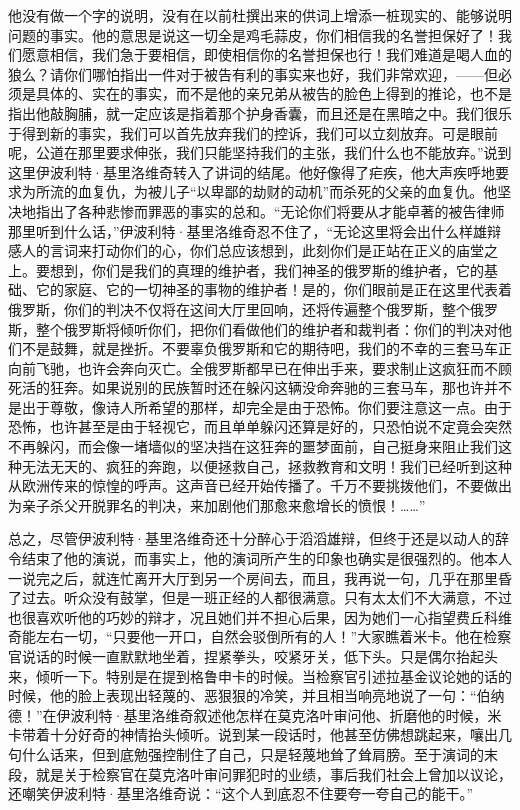 他没有做一个字的说明，没有在以前杜撰出来的供词上增添一桩现实的、能够说明问题的事实。他的意思是说这一切全是鸡毛蒜皮，你们相信我的名誉担保好了！我们愿意相信，我们急于要相信，即使相信你的名誉担保也行！我们难道是喝人血的狼么？请你们哪怕指出一件对于被告有利的事实来也好，我们非常欢迎，——但必须是具体的、实在的事实，而不是他的亲兄弟从被告的脸色上得到的推论，也不是指出他敲胸脯，就一定应该是指着那个护身香囊，而且还是在黑暗之中。我们很乐于得到新的事实，我们可以首先放弃我们的控诉，我们可以立刻放弃。可是眼前呢，公道在那里要求伸张，我们只能坚持我们的主张，我们什么也不能放弃。”说到这里伊波利特·基里洛维奇转入了讲词的结尾。他好像得了疟疾，他大声疾呼地要求为所流的血复仇，为被儿子“以卑鄙的劫财的动机”而杀死的父亲的血复仇。他坚决地指出了各种悲惨而罪恶的事实的总和。“无论你们将要从才能卓著的被告律师那里听到什么话，”伊波利特·基里洛维奇忍不住了，“无论这里将会出什么样雄辩感人的言词来打动你们的心，你们总应该想到，此刻你们是正站在正义的庙堂之上。要想到，你们是我们的真理的维护者，我们神圣的俄罗斯的维护者，它的基础、它的家庭、它的一切神圣的事物的维护者！是的，你们眼前是正在这里代表着俄罗斯，你们的判决不仅将在这间大厅里回响，还将传遍整个俄罗斯，整个俄罗斯，整个俄罗斯将倾听你们，把你们看做他们的维护者和裁判者：你们的判决对他们不是鼓舞，就是挫折。不要辜负俄罗斯和它的期待吧，我们的不幸的三套马车正向前飞驰，也许会奔向灭亡。全俄罗斯都早已在伸出手来，要求制止这疯狂而不顾死活的狂奔。如果说别的民族暂时还在躲闪这辆没命奔驰的三套马车，那也许并不是出于尊敬，像诗人所希望的那样，却完全是由于恐怖。你们要注意这一点。由于恐怖，也许甚至是由于轻视它，而且单单躲闪还算是好的，只恐怕说不定竟会突然不再躲闪，而会像一堵墙似的坚决挡在这狂奔的噩梦面前，自己挺身来阻止我们这种无法无天的、疯狂的奔跑，以便拯救自己，拯救教育和文明！我们已经听到这种从欧洲传来的惊惶的呼声。这声音已经开始传播了。千万不要挑拨他们，不要做出为亲子杀父开脱罪名的判决，来加剧他们那愈来愈增长的愤恨！……”
\par 总之，尽管伊波利特·基里洛维奇还十分醉心于滔滔雄辩，但终于还是以动人的辞令结束了他的演说，而事实上，他的演词所产生的印象也确实是很强烈的。他本人一说完之后，就连忙离开大厅到另一个房间去，而且，我再说一句，几乎在那里昏了过去。听众没有鼓掌，但是一班正经的人都很满意。只有太太们不大满意，不过也很喜欢听他的巧妙的辩才，况且她们并不担心后果，因为她们一心指望费丘科维奇能左右一切，“只要他一开口，自然会驳倒所有的人！”大家瞧着米卡。他在检察官说话的时候一直默默地坐着，捏紧拳头，咬紧牙关，低下头。只是偶尔抬起头来，倾听一下。特别是在提到格鲁申卡的时候。当检察官引述拉基金议论她的话的时候，他的脸上表现出轻蔑的、恶狠狠的冷笑，并且相当响亮地说了一句：“伯纳德！”在伊波利特·基里洛维奇叙述他怎样在莫克洛叶审问他、折磨他的时候，米卡带着十分好奇的神情抬头倾听。说到某一段话时，他甚至仿佛想跳起来，嚷出几句什么话来，但到底勉强控制住了自己，只是轻蔑地耸了耸肩膀。至于演词的末段，就是关于检察官在莫克洛叶审问罪犯时的业绩，事后我们社会上曾加以议论，还嘲笑伊波利特·基里洛维奇说：“这个人到底忍不住要夸一夸自己的能干。”
